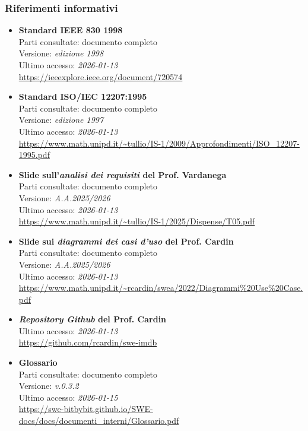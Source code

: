 \documentclass[a4paper,12pt]{article}
\begin{document}
\subsubsection{Riferimenti informativi} \label{sec:riferimenti_informativi}
\begin{itemize}
    \item \textbf{Standard IEEE 830 1998}\\
        Parti consultate: documento completo\\
        Versione: \textit{edizione 1998}\\
        Ultimo accesso: \textit{2026-01-13}\\
        \url{https://ieeexplore.ieee.org/document/720574}
    \item \textbf{Standard ISO/IEC 12207:1995}\\
        Parti consultate: documento completo\\
        Versione: \textit{edizione 1997} \\
        Ultimo accesso: \textit{2026-01-13}\\
        \url{https://www.math.unipd.it/~tullio/IS-1/2009/Approfondimenti/ISO_12207-1995.pdf}
    \item \textbf{Slide sull'\emph{analisi dei requisiti} del Prof. Vardanega}\\
        Parti consultate: documento completo\\
        Versione: \textit{A.A.2025/2026}\\
        Ultimo accesso: \textit{2026-01-13}\\
        \url{https://www.math.unipd.it/~tullio/IS-1/2025/Dispense/T05.pdf}
    \item \textbf{Slide sui \emph{diagrammi dei casi d'uso} del Prof. Cardin}\\
        Parti consultate: documento completo\\
        Versione: \textit{A.A.2025/2026}\\
        Ultimo accesso: \textit{2026-01-13}\\
        \url{https://www.math.unipd.it/~rcardin/swea/2022/Diagrammi%20Use%20Case.pdf}
    \item \textbf{\emph{Repository Github} del Prof. Cardin}\\
        Ultimo accesso: \textit{2026-01-13}\\
        \url{https://github.com/rcardin/swe-imdb}
    \item \textbf{Glossario}\\
        Parti consultate: documento completo\\
        Versione: \textit{v.0.3.2}\\
        Ultimo accesso: \textit{2026-01-15}\\
        \url{https://swe-bitbybit.github.io/SWE-docs/docs/documenti_interni/Glossario.pdf}
\end{itemize}
\end{document}
